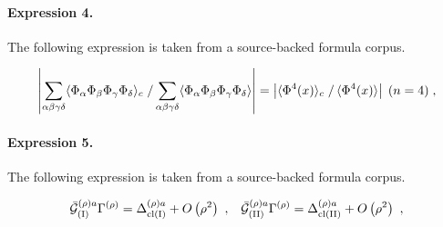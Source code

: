 \documentclass[11pt]{article}
\begin{document}
\paragraph{Expression 4.} The following expression is taken from a source-backed formula corpus.

\begin{align*}\left| \sum_{\alpha \beta \gamma \delta}\langle \Phi_{\alpha} \Phi_{\beta} \Phi_{\gamma} \Phi_{\delta} \rangle_c\left. \right/ \sum_{\alpha \beta \gamma \delta}\langle \Phi_{\alpha} \Phi_{\beta} \Phi_{\gamma} \Phi_{\delta} \rangle\right|=\left| \langle \Phi^4(x) \rangle_c \left. \right/\langle \Phi^4(x) \rangle \right|\; (n=4) \; ,\end{align*}

\paragraph{Expression 5.} The following expression is taken from a source-backed formula corpus.

\begin{align*}{\bar{{\cal G}}}_{({\rm I})}^{\left( \rho \right) a}\Gamma ^{\left( \rho\right) }=\Delta _{{\rm cl}({\rm I})}^{\left( \rho \right) a}+O\left( \rho^2\right) \,\,,\;\;\;{\bar{{\cal G}}}_{({\rm II})}^{\left( \rho \right)a}\Gamma ^{\left( \rho \right) }=\Delta _{{\rm cl}({\rm II})}^{\left( \rho\right) a}+O\left( \rho ^2\right) \,\,, \end{align*}
\end{document}

